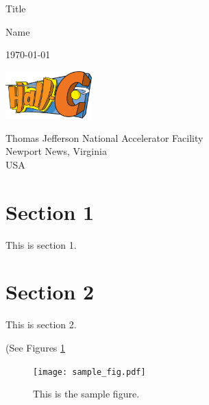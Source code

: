 \documentclass[11pt]{article}
\begin{document}
\begin{titlepage}
    \begin{center}
        \vspace*{1cm}
        
        
        {\Huge Title}
        
        \vspace{1.5cm}
        
        {\Large Name}
        
        \vspace{0.8cm}
        
        {\Large \today}

        \vspace{1.8cm}
                
        \includegraphics[width=0.25\textwidth]{hallc_logo.png}

        \vspace{2.0in}
        
        \large
        Thomas Jefferson National Accelerator Facility \\
        Newport News, Virginia\\
        USA\\
        \date{today}
        
    \end{center}
\end{titlepage}



\section{Section 1} 
\indent This is section 1.

\section{Section 2}
\indent This is section 2.

(See Figures \ref{fig:sample} 
\begin{figure}[h]
  \centering
  \texttt{[image: sample\_fig.pdf]}
  \caption{This is the sample figure.}
  \label{fig:sample}
\end{figure}
\newline

\newpage
\onecolumn


\end{document}
